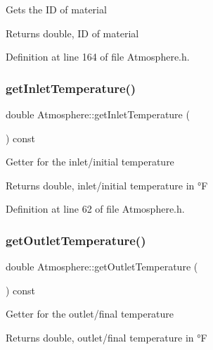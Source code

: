 Gets the ID of material \begin{DoxyReturn}{Returns}
double, ID of material 
\end{DoxyReturn}


Definition at line 164 of file Atmosphere.\+h.

\mbox{\label{class_atmosphere_acb944a3a99cd40f0132713ce73e6ca4a}} 
\subsubsection{\texorpdfstring{get\+Inlet\+Temperature()}{getInletTemperature()}}
{\footnotesize\ttfamily double Atmosphere\+::get\+Inlet\+Temperature (\begin{DoxyParamCaption}{ }\end{DoxyParamCaption}) const\hspace{0.3cm}{\ttfamily [inline]}}

Getter for the inlet/initial temperature \begin{DoxyReturn}{Returns}
double, inlet/initial temperature in °F 
\end{DoxyReturn}


Definition at line 62 of file Atmosphere.\+h.

\mbox{\label{class_atmosphere_a717e2dc78ebd13420f8f26707374dd3f}} 
\subsubsection{\texorpdfstring{get\+Outlet\+Temperature()}{getOutletTemperature()}}
{\footnotesize\ttfamily double Atmosphere\+::get\+Outlet\+Temperature (\begin{DoxyParamCaption}{ }\end{DoxyParamCaption}) const\hspace{0.3cm}{\ttfamily [inline]}}

Getter for the outlet/final temperature \begin{DoxyReturn}{Returns}
double, outlet/final temperature in °F 
\end{DoxyReturn}


